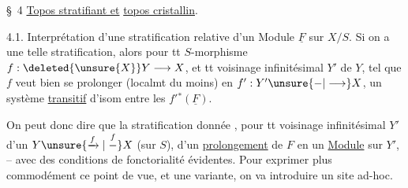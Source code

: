 \S~4 \uline{Topos stratifiant et} \uline{topos cristallin}.

4.1. Interprétation d'une stratification relative d'un Module $\underline F$ sur $X/S$. Si on a une telle stratification, alors pour tt $S$-morphisme $f:\deleted{\unsure{X}}Y\longrightarrow X$, et tt voisinage infinitésimal $Y'$ de $Y$,   tel que $f$ veut bien se prolonger (localmt du moins) en $f':Y'\unsure{\mathbin{-}|\longrightarrow}X$, un système \uline{transitif} d'isom entre les $f'{}^*(\underline F)$.

On peut donc dire que la   stratification   donnée  , pour tt voisinage infinitésimal $Y'$ d'un $Y\unsure{\xrightarrow{f}|\mathrel{\overset f{-}}}X$ (sur $S$),  d'un \uline{prolongement}  de $F$ en un \uline{Module} sur $Y'$, -- avec des conditions de fonctorialité évidentes. Pour exprimer plus commodément ce point de vue, et une variante, on va introduire un site ad-hoc.

